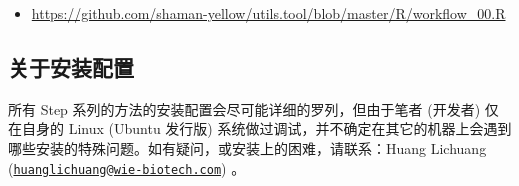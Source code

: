 \documentclass[
]{article}
\providecommand{\tightlist}{%
  \setlength{\itemsep}{0pt}\setlength{\parskip}{0pt}}
\begin{document}
\begin{itemize}
\tightlist
\item
  \url{https://github.com/shaman-yellow/utils.tool/blob/master/R/workflow_00.R}
\end{itemize}

\hypertarget{ux5173ux4e8eux5b89ux88c5ux914dux7f6e}{%
\subsection{关于安装配置}\label{ux5173ux4e8eux5b89ux88c5ux914dux7f6e}}

所有 Step 系列的方法的安装配置会尽可能详细的罗列，但由于笔者 (开发者) 仅在自身的 Linux (Ubuntu 发行版) 系统做过调试，并不确定在其它的机器上会遇到哪些安装的特殊问题。如有疑问，或安装上的困难，请联系：Huang Lichuang (\href{mailto:huanglichuang@wie-biotech.com}{\nolinkurl{huanglichuang@wie-biotech.com}}) 。
\end{document}
